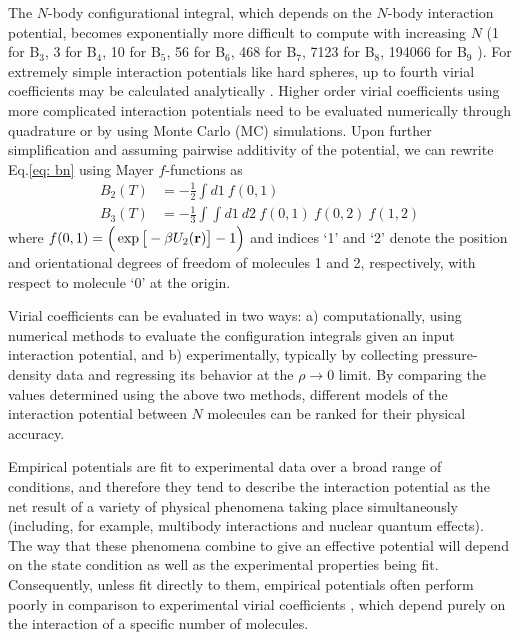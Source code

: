         The $N$-body configurational integral, which depends on the $N$-body interaction potential, becomes exponentially more difficult to compute with increasing $N$ (1 for B$_3$, 3 for B$_4$, 10 for B$_5$, 56 for B$_6$, 468 for B$_7$, 7123 for B$_8$, 194066 for B$_9$ \cite{ShaulPhD,Masters2008,Labik2005}). For extremely simple interaction potentials like hard spheres, up to fourth virial coefficients may be calculated analytically \cite{Masters2008}. Higher order virial coefficients using more complicated interaction potentials need to be evaluated numerically through quadrature or by using Monte Carlo (MC) simulations. Upon further simplification and assuming pairwise additivity of the potential, we can rewrite Eq.\eqref{eq: bn} using Mayer $f$-functions as \cite{Masters2008,Hansen}
        \begin{equation} \label{eq: mayerfn}
            \begin{aligned}
                B_2(T) &= -\frac{1}{2} \displaystyle\int d1 ~ f(0,1)\\
                B_3(T) &= -\frac{1}{3} \displaystyle\int \int d1~d2~f(0,1)~f(0,2)~f(1,2)
            \end{aligned}
        \end{equation}
        where $f(0,1) = \Big( \exp \big[ -\beta U_2({\mathbf {r}}) \big] - 1 \Big) $ and indices `1' and `2' denote the position and orientational degrees of freedom of molecules 1 and 2, respectively, with respect to molecule `0' at the origin.

        Virial coefficients can be evaluated in two ways: a) computationally, using numerical methods to evaluate the configuration integrals given an input interaction potential, and b) experimentally, typically by collecting pressure-density data and regressing its behavior at the $\rho \to 0$ limit. By comparing the values determined using the above two methods, different models of the interaction potential between $N$ molecules can be ranked for their physical accuracy.

        Empirical potentials are fit to experimental data over a broad range of conditions, and therefore they tend to describe the interaction potential as the net result of a variety of physical phenomena taking place simultaneously (including, for example, multibody interactions and nuclear quantum effects). The way that these phenomena combine to give an effective potential will depend on the state condition as well as the experimental properties being fit. Consequently, unless fit directly to them, empirical potentials often perform poorly in comparison to experimental virial coefficients \cite{Benjamin2007}, which depend purely on the interaction of a specific number of molecules.

